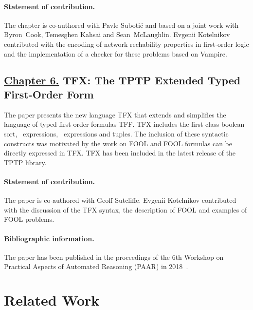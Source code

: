 \paragraph{Statement of contribution.} The chapter is co-authored with Pavle Suboti\'{c} and based on a joint work with Byron~Cook, Temesghen Kahsai and Sean~McLaughlin. Evgenii Kotelnikov contributed with the encoding of network rechability properties in first-order logic and the implementation of a checker for these problems based on Vampire.

\subsection*{\hyperref[chap:tfx]{Chapter 6.} TFX: The TPTP Extended Typed First-Order Form}
The paper presents the new language TFX that extends and simplifies the language of typed first-order formulas TFF. TFX includes the first class boolean sort, \ITE\ expressions, \LETIN\ expressions and tuples. The inclusion of these syntactic constructs was motivated by the work on FOOL and FOOL formulas can be directly expressed in TFX. TFX has been included in the latest release of the TPTP library.

\paragraph{Statement of contribution.} The paper is co-authored with Geoff Sutcliffe. Evgenii Kotelnikov contributed with the discussion of the TFX syntax, the description of FOOL and examples of FOOL problems.

\paragraph{Bibliographic information.} The paper has been published in the proceedings of the 6th Workshop on Practical Aspects of Automated Reasoning (PAAR) in 2018~\cite{SutcliffeK18}.

\section*{Related Work}


